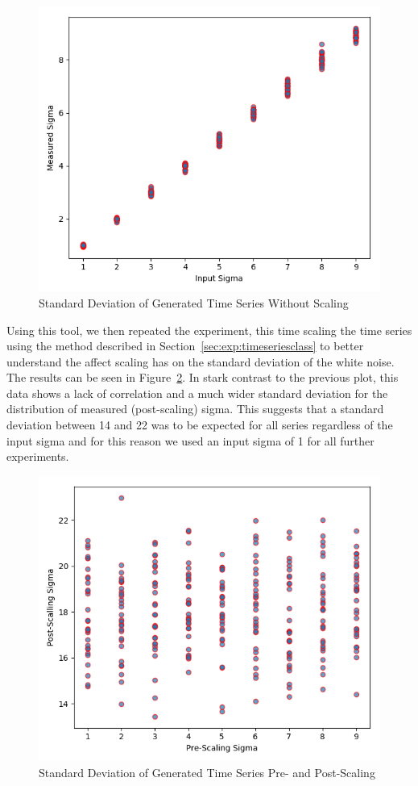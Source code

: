 \documentclass[oneside,12pt,openany]{book}
\begin{document}
    \begin{figure}[!ht]
        \centering
        \includegraphics[width=.8\linewidth]{images/SigmaOfSeries-PreScaling.png}
        \caption{Standard Deviation of Generated Time Series Without Scaling}
        \label{fig:sigmaofseries-pre}
    \end{figure}
    
    Using this tool, we then repeated the experiment, this time scaling the time series using the method described in Section~\ref{sec:exp:timeseriesclass} to better understand the affect scaling has on the standard deviation of the white noise. The results can be seen in Figure~\ref{fig:sigmaofseries-post}. In stark contrast to the previous plot, this data shows a lack of correlation and a much wider standard deviation for the distribution of measured (post-scaling) sigma. This suggests that a standard deviation between 14 and 22 was to be expected for all series regardless of the input sigma and for this reason we used an input sigma of 1 for all further experiments.
    
    \begin{figure}[!ht]
        \centering
        \includegraphics[width=.8\linewidth]{images/SigmaOfSeries-PostScaling.png}
        \caption{Standard Deviation of Generated Time Series Pre- and Post-Scaling}
        \label{fig:sigmaofseries-post}
    \end{figure}
\end{document}
